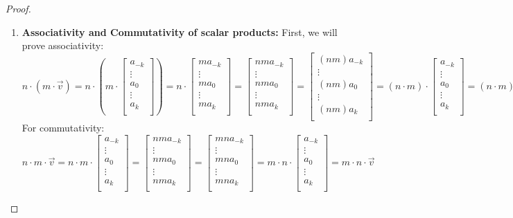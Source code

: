 \documentclass[11pt]{article}
\newcommand{\vect}[1]{\begin{bmatrix}#1\end{bmatrix}}
\begin{document}
\begin{enumerate}[label=\arabic*.]
\begin{proof}
\begin{enumerate}
        \item \textbf{Associativity and Commutativity of scalar products:} First, we will prove associativity:
        \[
        n\cdot (m\cdot \vec{v}) 
        = n \cdot \left(m \cdot \vect{a_{-k} \\ \vdots \\a_0 \\ \vdots \\ a_k \\} \right) 
        = n \cdot \vect{ma_{-k} \\ \vdots \\ma_0 \\ \vdots \\ ma_k \\} 
        = \vect{nma_{-k} \\ \vdots \\nma_0 \\ \vdots \\ nma_k \\} 
        = \vect{(nm)a_{-k} \\ \vdots \\(nm)a_0 \\ \vdots \\ (nm)a_k \\} 
        = (n \cdot m) \cdot \vect{a_{-k} \\ \vdots \\a_0 \\ \vdots \\ a_k \\}
        = (n\cdot m)\cdot \vec{v}
        \]
        For commutativity:
        \[
        n\cdot m\cdot \vec{v}
        = n \cdot m \cdot \vect{a_{-k} \\ \vdots \\a_0 \\ \vdots \\ a_k \\}
        = \vect{nma_{-k} \\ \vdots \\nma_0 \\ \vdots \\ nma_k \\} 
        = \vect{mna_{-k} \\ \vdots \\mna_0 \\ \vdots \\ mna_k \\} 
        = m \cdot n \cdot \vect{a_{-k} \\ \vdots \\a_0 \\ \vdots \\ a_k \\}
        = m \cdot n \cdot \vec{v}
        \]
        

\end{enumerate}
\end{proof}
\end{enumerate}
\end{document}
